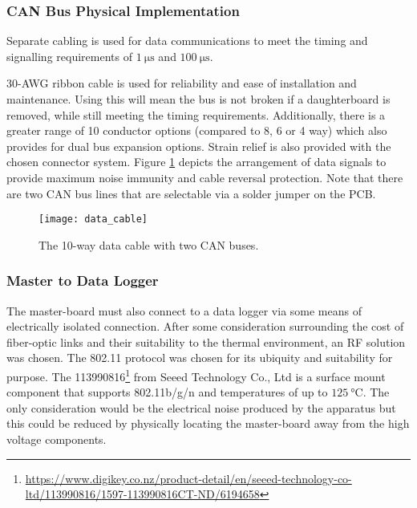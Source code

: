 \subsubsection{CAN Bus Physical Implementation}
Separate cabling is used for data communications to meet the timing and signalling requirements of $\SI{1}{\micro\second}$ and $\SI{100}{\micro\second}$.

30-AWG ribbon cable is used for reliability and ease of installation and maintenance.
Using this will mean the bus is not broken if a daughterboard is removed, while still meeting the timing requirements.
Additionally, there is a greater range of 10 conductor options (compared to 8, 6 or 4 way) which also provides for dual bus expansion options.
Strain relief is also provided with the chosen connector system.
Figure \ref{fig:data_cable} depicts the arrangement of data signals to provide maximum noise immunity and cable reversal protection.
Note that there are two CAN bus lines that are selectable via a solder jumper on the PCB.
\begin{figure}[H]
	\centering
	\texttt{[image: data\_cable]}
	\caption{The 10-way data cable with two CAN buses.}
	\label{fig:data_cable}
\end{figure}

\subsubsection{Master to Data Logger}

The master-board must also connect to a data logger via some means of electrically isolated connection.
After some consideration surrounding the cost of fiber-optic links and their suitability to the thermal environment, an RF solution was chosen.
The 802.11 protocol was chosen for its ubiquity and suitability for purpose.
The 113990816\footnote{\url{https://www.digikey.co.nz/product-detail/en/seeed-technology-co-ltd/113990816/1597-113990816CT-ND/6194658}} from Seeed Technology Co., Ltd is a surface mount component that supports 802.11b/g/n and temperatures of up to $\SI{125}{\degreeCelsius}$.
The only consideration would be the electrical noise produced by the apparatus but this could be reduced by physically locating the master-board away from the high voltage components.
